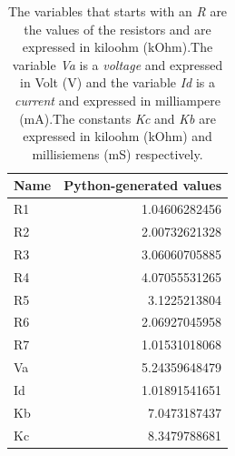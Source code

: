 \begin{table}[h]
  \centering
  \begin{tabular}{|l|r|}
    \hline    
    {\bf Name} & {\bf Python-generated values} \\ \hline
	R1 &  1.04606282456 \\ \hline
	R2 &  2.00732621328 \\ \hline
	R3 &  3.06060705885 \\ \hline
	R4 &  4.07055531265 \\ \hline
	R5 &  3.1225213804 \\ \hline
	R6 &  2.06927045958 \\ \hline
	R7 &  1.01531018068 \\ \hline
	Va &  5.24359648479 \\ \hline
	Id &  1.01891541651 \\ \hline
	Kb &  7.0473187437 \\ \hline
	Kc &  8.3479788681 \\ \hline
	\hline
  \end{tabular}
  \caption{The variables that starts with an {\it R} are the values of the resistors 
    and are expressed in  kiloohm  (kOhm).The variable {\it Va}  is a {\it voltage} and expressed in
    Volt (V) and the variable {\it Id}  is a {\it current} and expressed in
   milliampere (mA).The constants {\it Kc} and {\it Kb} are  expressed in
   kiloohm  (kOhm) and millisiemens (mS) respectively. }
  \label{tab:python_values}
\end{table}

\pagebreak


